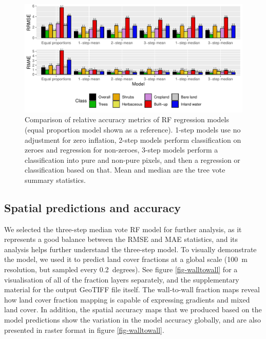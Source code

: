 \documentclass[review,authoryear,3p]{elsarticle}
\begin{document}
\begin{figure}
    \centering
    \includegraphics[width=\textwidth]{article-figures/barplots/2020-11-02-rf-comparison-bar}
    \caption{Comparison of relative accuracy metrics of RF regression models (equal proportion model shown as a reference). 1-step models use no adjustment for zero inflation, 2-step models perform classification on zeroes and regression for non-zeroes, 3-step models perform a classification into pure and non-pure pixels, and then a regression or classification based on that. Mean and median are the tree vote summary statistics.}
    \label{fig-randomforest-relative}
\end{figure}

\subsection{Spatial predictions and accuracy}

We selected the three-step median vote \gls{RF} model for further analysis, as it represents a good balance between the \gls{RMSE} and \gls{MAE} statistics, and its analysis helps further understand the three-step model.
To visually demonstrate the model, we used it to predict land cover fractions at a global scale (100~m resolution, but sampled every 0.2~degrees).
See figure \ref{fig-walltowall} for a visualisation of all of the fraction layers separately, and the supplementary material for the output GeoTIFF file itself.
The wall-to-wall fraction maps reveal how land cover fraction mapping is capable of expressing gradients and mixed land cover.
In addition, the spatial accuracy maps that we produced based on the model predictions show the variation in the model accuracy globally, and are also presented in raster format in figure \ref{fig-walltowall}.
\end{document}
